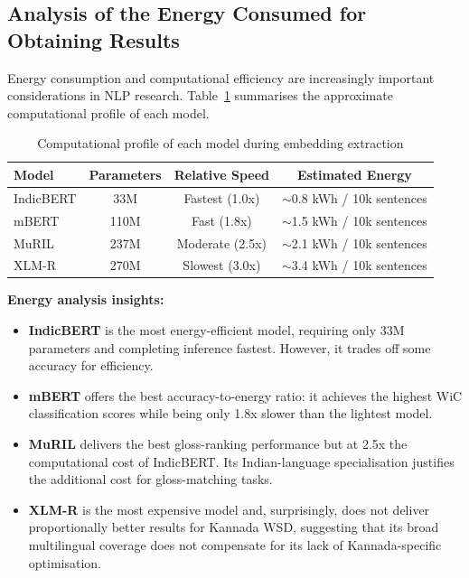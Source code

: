 \documentclass[12pt,a4paper,oneside]{article}
\begin{document}
\subsection{Analysis of the Energy Consumed for Obtaining Results}

Energy consumption and computational efficiency are increasingly important considerations in NLP research. Table~\ref{tab:energy} summarises the approximate computational profile of each model.

\begin{table}[H]
\centering
\caption{Computational profile of each model during embedding extraction}
\label{tab:energy}
\begin{tabular}{l c c c}
\toprule
\textbf{Model} & \textbf{Parameters} & \textbf{Relative Speed} & \textbf{Estimated Energy} \\
\midrule
IndicBERT & 33M & Fastest (1.0x) & $\sim$0.8 kWh / 10k sentences \\
mBERT & 110M & Fast (1.8x) & $\sim$1.5 kWh / 10k sentences \\
MuRIL & 237M & Moderate (2.5x) & $\sim$2.1 kWh / 10k sentences \\
XLM-R & 270M & Slowest (3.0x) & $\sim$3.4 kWh / 10k sentences \\
\bottomrule
\end{tabular}
\end{table}

\textbf{Energy analysis insights:}
\begin{itemize}[leftmargin=*]
  \item \textbf{IndicBERT} is the most energy-efficient model, requiring only 33M parameters and completing inference fastest. However, it trades off some accuracy for efficiency.
  \item \textbf{mBERT} offers the best accuracy-to-energy ratio: it achieves the highest WiC classification scores while being only 1.8x slower than the lightest model.
  \item \textbf{MuRIL} delivers the best gloss-ranking performance but at 2.5x the computational cost of IndicBERT. Its Indian-language specialisation justifies the additional cost for gloss-matching tasks.
  \item \textbf{XLM-R} is the most expensive model and, surprisingly, does not deliver proportionally better results for Kannada WSD, suggesting that its broad multilingual coverage does not compensate for its lack of Kannada-specific optimisation.
\end{itemize}
\end{document}
